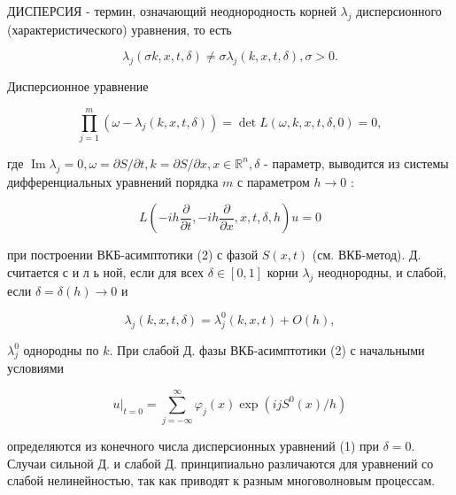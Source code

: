 \documentclass[10pt]{article}
\begin{document}
ДИСПЕРСИЯ - термин, означающий неоднородность корней $\lambda_{j}$ дисперсионного (характеристического) уравнения, то есть



\[

\lambda_{j}(\sigma k, x, t, \delta) \neq \sigma \lambda_{j}(k, x, t, \delta), \sigma>0 .

\]



Дисперсионное уравнение



\[

\prod_{j=1}^{m}\left(\omega-\lambda_{j}(k, x, t, \delta)\right)=\operatorname{det} L(\omega, k, x, t, \delta, 0)=0,

\]



где $\operatorname{Im} \lambda_{j}=0, \omega=\partial S / \partial t, k=\partial S / \partial x, x \in \mathbb{R}^{n}, \delta$ - параметр, выводится из системы дифференциальных уравнений порядка $m$ с параметром $h \rightarrow 0$ :



\[

L\left(-i h \frac{\partial}{\partial t},-i h \frac{\partial}{\partial x}, x, t, \delta, h\right) u=0

\]



при построении ВКБ-асимптотики (2) с фазой $S(x, t)$ (см. ВКБ-метод). Д. считается с и л ь ной, если для всех $\delta \in[0,1]$ корни $\lambda_{j}$ неоднородны, и слабой, если $\delta=\delta(h) \rightarrow 0$ и



\[

\lambda_{j}(k, x, t, \delta)=\lambda_{j}^{0}(k, x, t)+O(h),

\]



$\lambda_{j}^{0}$ однородны по $k$. При слабой Д. фазы ВКБ-асимптотики (2) с начальными условиями



\[

\left.u\right|_{t=0}=\sum_{j=-\infty}^{\infty} \varphi_{j}(x) \exp \left(i j S^{0}(x) / h\right)

\]



определяются из конечного числа дисперсионных уравнений (1) при $\delta=0$. Случаи сильной Д. и слабой Д. принципиально различаются для уравнений со слабой нелинейностью, так как приводят к разным многоволновым процессам.
\end{document}
